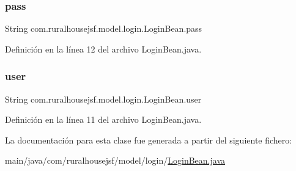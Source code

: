 \subsubsection{\texorpdfstring{pass}{pass}}
{\footnotesize\ttfamily String com.\+ruralhousejsf.\+model.\+login.\+Login\+Bean.\+pass\hspace{0.3cm}{\ttfamily [private]}}



Definición en la línea 12 del archivo Login\+Bean.\+java.

\mbox{\label{a00232_a06e00e34aacd95ab04a33bae5bc50b34}} 
\subsubsection{\texorpdfstring{user}{user}}
{\footnotesize\ttfamily String com.\+ruralhousejsf.\+model.\+login.\+Login\+Bean.\+user\hspace{0.3cm}{\ttfamily [private]}}



Definición en la línea 11 del archivo Login\+Bean.\+java.



La documentación para esta clase fue generada a partir del siguiente fichero\+:\begin{DoxyCompactItemize}
\item 
main/java/com/ruralhousejsf/model/login/\mbox{\hyperlink{a00080}{Login\+Bean.\+java}}\end{DoxyCompactItemize}
